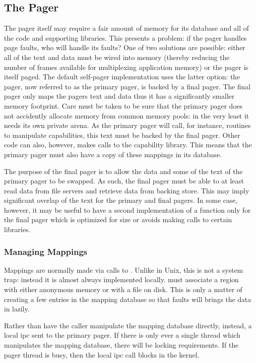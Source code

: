 \subsection{The Pager}

The pager itself may require a fair amount of memory for its database
and all of the code and supporting libraries.  This presents a
problem: if the pager handles page faults, who will handle its faults?
One of two solutions are possible: either all of the text and data
must be wired into memory (thereby reducing the number of frames
available for multiplexing application memory) or the pager is itself
paged.  The default self-pager implementation uses the latter option:
the pager, now referred to as the primary pager, is backed by a final
pager.  The final pager only maps the pagers text and data thus it has
a significantly smaller memory footprint.  Care must be taken to be
sure that the primary pager does not accidently allocate memory from
common memory pools: in the very least it needs its own private
 arena.  As the primary pager will call, for
instance, routines to manipulate capabilities, this text must be
backed by the final pager.  Other code can also, however, makes calls
to the capability library.  This means that the primary pager must
also have a copy of these mappings in its database.

The purpose of the final pager is to allow the data and some of the
text of the primary pager to be swapped.  As such, the final pager
must be able to at least read data from file servers and retrieve data
from backing store.  This may imply significant overlap of the text
for the primary and final pagers.  In some case, however, it may be
useful to have a second implementation of a function only for the
final pager which is optimized for size or avoids making calls to
certain libraries.

\subsubsection{Managing Mappings}

Mappings are normally made via calls to .  Unlike in
Unix, this is not a system trap: instead it is almost always
implemented locally.   must associate a region with
either anonymous memory or with a file on disk.  This is only a matter
of creating a few entries in the mapping database so that faults will
brings the data in lazily.

Rather than have the caller manipulate the mapping database directly,
instead, a local ipc sent to the primary pager.  If there is only ever
a single thread which manipulates the mapping database, there will be
locking requirements.  If the pager thread is busy, then the local ipc
call blocks in the kernel.

